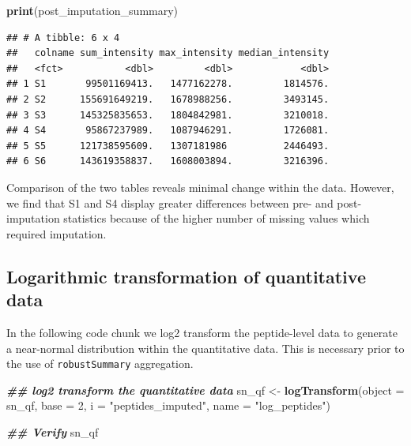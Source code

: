 \documentclass[9pt,a4paper,]{extarticle}
\newenvironment{Shaded}{\begin{snugshade}}{\end{snugshade}}
\newcommand{\AttributeTok}[1]{\textcolor[rgb]{0.13,0.29,0.53}{#1}}
\newcommand{\DecValTok}[1]{\textcolor[rgb]{0.00,0.00,0.81}{#1}}
\newcommand{\DocumentationTok}[1]{\textcolor[rgb]{0.56,0.35,0.01}{\textbf{\textit{#1}}}}
\newcommand{\FunctionTok}[1]{\textcolor[rgb]{0.13,0.29,0.53}{\textbf{#1}}}
\newcommand{\NormalTok}[1]{#1}
\newcommand{\OtherTok}[1]{\textcolor[rgb]{0.56,0.35,0.01}{#1}}
\newcommand{\StringTok}[1]{\textcolor[rgb]{0.31,0.60,0.02}{#1}}
\begin{document}
\begin{Shaded}
\begin{Highlighting}[]
\FunctionTok{print}\NormalTok{(post\_imputation\_summary)}
\end{Highlighting}
\end{Shaded}

\begin{verbatim}
## # A tibble: 6 x 4
##   colname sum_intensity max_intensity median_intensity
##   <fct>           <dbl>         <dbl>            <dbl>
## 1 S1       99501169413.   1477162278.         1814576.
## 2 S2      155691649219.   1678988256.         3493145.
## 3 S3      145325835653.   1804842981.         3210018.
## 4 S4       95867237989.   1087946291.         1726081.
## 5 S5      121738595609.   1307181986          2446493.
## 6 S6      143619358837.   1608003894.         3216396.
\end{verbatim}

Comparison of the two tables reveals minimal change within the data. However, we
find that S1 and S4 display greater differences between pre- and post-imputation
statistics because of the higher number of missing values which required
imputation.

\subsection{Logarithmic transformation of quantitative data}\label{logarithmic-transformation-of-quantitative-data-1}

In the following code chunk we log2 transform the peptide-level data to generate
a near-normal distribution within the quantitative data. This is necessary prior
to the use of \texttt{robustSummary} aggregation.

\begin{Shaded}
\begin{Highlighting}[]
\DocumentationTok{\#\# log2 transform the quantitative data}
\NormalTok{sn\_qf }\OtherTok{\textless{}{-}} \FunctionTok{logTransform}\NormalTok{(}\AttributeTok{object =}\NormalTok{ sn\_qf,}
                      \AttributeTok{base =} \DecValTok{2}\NormalTok{,}
                      \AttributeTok{i =} \StringTok{"peptides\_imputed"}\NormalTok{,}
                      \AttributeTok{name =} \StringTok{"log\_peptides"}\NormalTok{)}

\DocumentationTok{\#\# Verify}
\NormalTok{sn\_qf}
\end{Highlighting}
\end{Shaded}
\end{document}
